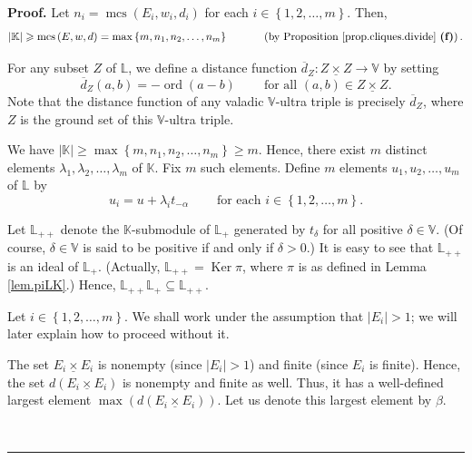 \documentclass[numbers=enddot,12pt,final,onecolumn,notitlepage]{scrartcl}%
\theoremstyle{definition}
\newenvironment{proof}[1][Proof]{\noindent\textbf{#1.} }{\ \rule{0.5em}{0.5em}}
\newcommand{\timesu}{\mathbin{\underline{\times}}}
\renewcommand{\geq}{\geqslant}
\theoremstyle{plainsl}
\begin{document}
\begin{proof}
Let $n_{i}=\operatorname*{mcs}\left(  E_{i},w_{i},d_{i}\right)  $ for each
$i\in\left\{  1,2,\ldots,m\right\}  $. Then,%
\[
\left\vert \mathbb{K}\right\vert \geq\operatorname*{mcs}\left(  E,w,d\right)
=\max\left\{  m,n_{1},n_{2},\ldots,n_{m}\right\}  \ \ \ \ \ \ \ \ \ \ \left(
\text{by Proposition \ref{prop.cliques.divide} \textbf{(f)}}\right)  .
\]


For any subset $Z$ of $\mathbb{L}$, we define a distance function
$\overline{d}_{Z}:Z\timesu Z\rightarrow\mathbb{V}$ by setting%
\begin{equation}
\overline{d}_{Z}\left(  a,b\right)  =-\operatorname*{ord}\left(  a-b\right)
\ \ \ \ \ \ \ \ \ \ \text{for all }\left(  a,b\right)  \in Z\timesu Z.
\label{pf.thm.approx-p.dZ}%
\end{equation}
Note that the distance function of any valadic $\mathbb{V}$-ultra triple is
precisely $\overline{d}_{Z}$, where $Z$ is the ground set of this $\mathbb{V}%
$-ultra triple.

We have $\left\vert \mathbb{K}\right\vert \geq\max\left\{  m,n_{1}%
,n_{2},\ldots,n_{m}\right\}  \geq m$. Hence, there exist $m$ distinct elements
$\lambda_{1},\lambda_{2},\ldots,\lambda_{m}$ of $\mathbb{K}$. Fix $m$ such
elements. Define $m$ elements $u_{1},u_{2},\ldots,u_{m}$ of $\mathbb{L}$ by%
\begin{equation}
u_{i}=u+\lambda_{i}t_{-\alpha}\ \ \ \ \ \ \ \ \ \ \text{for each }i\in\left\{
1,2,\ldots,m\right\}  \text{.} \label{pf.thm.approx-p.ui=}%
\end{equation}


Let $\mathbb{L}_{++}$ denote the $\mathbb{K}$-submodule of $\mathbb{L}_{+}$
generated by $t_{\delta}$ for all positive $\delta\in\mathbb{V}$. (Of course,
$\delta\in\mathbb{V}$ is said to be positive if and only if $\delta>0$.) It is
easy to see that $\mathbb{L}_{++}$ is an ideal of $\mathbb{L}_{+}$. (Actually,
$\mathbb{L}_{++}=\operatorname*{Ker}\pi$, where $\pi$ is as defined in Lemma
\ref{lem.piLK}.) Hence, $\mathbb{L}_{++}\mathbb{L}_{+}\subseteq\mathbb{L}%
_{++}$.

Let $i\in\left\{  1,2,\ldots,m\right\}  $. We shall work under the assumption
that $\left\vert E_{i}\right\vert >1$; we will later explain how to proceed
without it.

The set $E_{i}\timesu E_{i}$ is nonempty (since $\left\vert E_{i}\right\vert
>1$) and finite (since $E_{i}$ is finite). Hence, the set $d\left(
E_{i}\timesu E_{i}\right)  $ is nonempty and finite as well. Thus, it has a
well-defined largest element $\max\left(  d\left(  E_{i}\timesu E_{i}\right)
\right)  $. Let us denote this largest element by $\beta$.


\end{proof}
\end{document}
